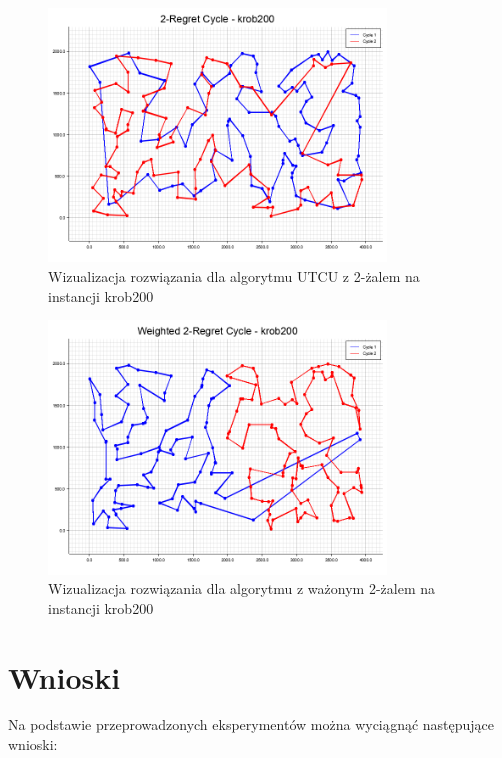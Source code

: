 \documentclass[12pt,a4paper]{article}
\begin{document}
\begin{figure}[H]
\centering
\includegraphics[width=0.8\textwidth]{figures/krob200_2-Regret_Cycle.png}
\caption{Wizualizacja rozwiązania dla algorytmu UTCU z 2-żalem na instancji krob200}
\end{figure}

\begin{figure}[H]
\centering
\includegraphics[width=0.8\textwidth]{figures/krob200_Weighted_2-Regret_Cycle.png}
\caption{Wizualizacja rozwiązania dla algorytmu z ważonym 2-żalem na instancji krob200}
\end{figure}

\section{Wnioski}
Na podstawie przeprowadzonych eksperymentów można wyciągnąć następujące wnioski:
\end{document}
